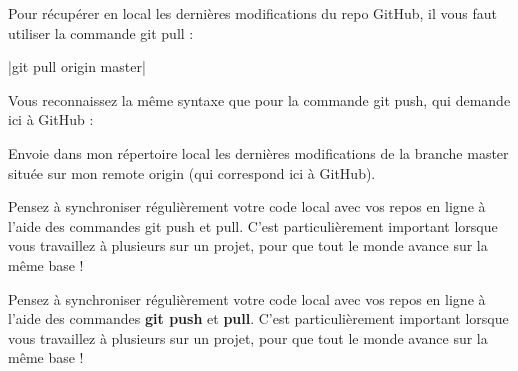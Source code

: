 Pour récupérer en local les dernières modifications du repo GitHub, il vous faut utiliser la commande git pull : 

|git pull origin master|

Vous reconnaissez la même syntaxe que pour la commande git push, qui demande ici à GitHub : 

Envoie dans mon répertoire local les dernières modifications de la branche master située sur mon remote origin (qui correspond ici à GitHub). 

\begin{remark} Pensez à synchroniser régulièrement votre code local avec vos repos en ligne à l'aide des commandes git push et pull. C'est particulièrement important lorsque vous travaillez à plusieurs sur un projet, pour que tout le monde avance sur la même base ! \end{remark}

Pensez à synchroniser régulièrement votre code local avec vos repos en ligne à l'aide des commandes \textbf{git push} et \textbf{pull}. C'est particulièrement important lorsque vous travaillez à plusieurs sur un projet, pour que tout le monde avance sur la même base !
